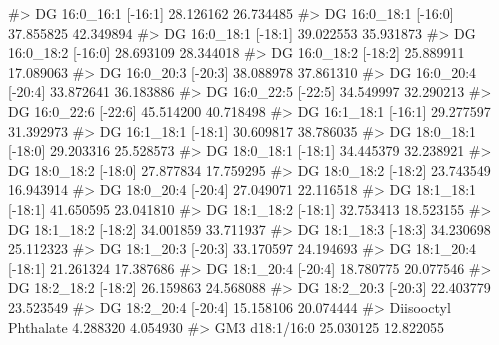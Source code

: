 \documentclass[
  letterpaper,
  DIV=11,
  numbers=noendperiod]{scrreprt}
\newenvironment{Shaded}{\begin{snugshade}}{\end{snugshade}}
\newcommand{\CommentTok}[1]{\textcolor[rgb]{0.37,0.37,0.37}{#1}}
\begin{document}
\begin{Shaded}
\begin{Highlighting}[]
\CommentTok{\#\textgreater{} DG 16:0\_16:1 [{-}16:1]                      28.126162 26.734485}
\CommentTok{\#\textgreater{} DG 16:0\_18:1 [{-}16:0]                      37.855825 42.349894}
\CommentTok{\#\textgreater{} DG 16:0\_18:1 [{-}18:1]                      39.022553 35.931873}
\CommentTok{\#\textgreater{} DG 16:0\_18:2 [{-}16:0]                      28.693109 28.344018}
\CommentTok{\#\textgreater{} DG 16:0\_18:2 [{-}18:2]                      25.889911 17.089063}
\CommentTok{\#\textgreater{} DG 16:0\_20:3 [{-}20:3]                      38.088978 37.861310}
\CommentTok{\#\textgreater{} DG 16:0\_20:4 [{-}20:4]                      33.872641 36.183886}
\CommentTok{\#\textgreater{} DG 16:0\_22:5 [{-}22:5]                      34.549997 32.290213}
\CommentTok{\#\textgreater{} DG 16:0\_22:6 [{-}22:6]                      45.514200 40.718498}
\CommentTok{\#\textgreater{} DG 16:1\_18:1 [{-}16:1]                      29.277597 31.392973}
\CommentTok{\#\textgreater{} DG 16:1\_18:1 [{-}18:1]                      30.609817 38.786035}
\CommentTok{\#\textgreater{} DG 18:0\_18:1 [{-}18:0]                      29.203316 25.528573}
\CommentTok{\#\textgreater{} DG 18:0\_18:1 [{-}18:1]                      34.445379 32.238921}
\CommentTok{\#\textgreater{} DG 18:0\_18:2 [{-}18:0]                      27.877834 17.759295}
\CommentTok{\#\textgreater{} DG 18:0\_18:2 [{-}18:2]                      23.743549 16.943914}
\CommentTok{\#\textgreater{} DG 18:0\_20:4 [{-}20:4]                      27.049071 22.116518}
\CommentTok{\#\textgreater{} DG 18:1\_18:1 [{-}18:1]                      41.650595 23.041810}
\CommentTok{\#\textgreater{} DG 18:1\_18:2 [{-}18:1]                      32.753413 18.523155}
\CommentTok{\#\textgreater{} DG 18:1\_18:2 [{-}18:2]                      34.001859 33.711937}
\CommentTok{\#\textgreater{} DG 18:1\_18:3 [{-}18:3]                      34.230698 25.112323}
\CommentTok{\#\textgreater{} DG 18:1\_20:3 [{-}20:3]                      33.170597 24.194693}
\CommentTok{\#\textgreater{} DG 18:1\_20:4 [{-}18:1]                      21.261324 17.387686}
\CommentTok{\#\textgreater{} DG 18:1\_20:4 [{-}20:4]                      18.780775 20.077546}
\CommentTok{\#\textgreater{} DG 18:2\_18:2 [{-}18:2]                      26.159863 24.568088}
\CommentTok{\#\textgreater{} DG 18:2\_20:3 [{-}20:3]                      22.403779 23.523549}
\CommentTok{\#\textgreater{} DG 18:2\_20:4 [{-}20:4]                      15.158106 20.074444}
\CommentTok{\#\textgreater{} Diisooctyl Phthalate                       4.288320  4.054930}
\CommentTok{\#\textgreater{} GM3 d18:1/16:0                            25.030125 12.822055}

\end{Highlighting}
\end{Shaded}
\end{document}
